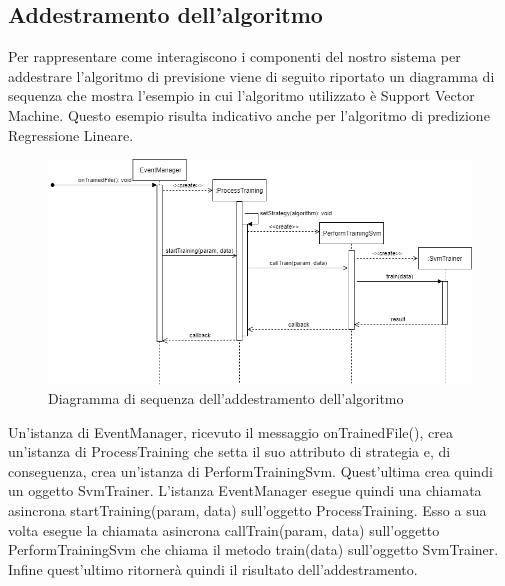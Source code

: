 	\subsection{Addestramento dell'algoritmo}
	Per rappresentare come interagiscono i componenti del nostro sistema per addestrare l'algoritmo di previsione viene di seguito riportato un diagramma di sequenza che mostra l'esempio in cui l'algoritmo utilizzato è Support Vector Machine. Questo esempio risulta indicativo anche per l'algoritmo di predizione Regressione Lineare.  
	\mbox{}
	\begin{landscape}
		\begin{figure} [H]
			\includegraphics[width=\linewidth]{./img/Diagrammi/ds2.png}
			\caption{Diagramma di sequenza dell'addestramento dell'algoritmo}
		\end{figure}
	\end{landscape}
	Un'istanza di EventManager, ricevuto il messaggio onTrainedFile(), crea un'istanza di ProcessTraining che setta il suo attributo di strategia e, di conseguenza, crea un'istanza di PerformTrainingSvm. Quest'ultima crea quindi un oggetto SvmTrainer.
	L'istanza EventManager esegue quindi una chiamata asincrona startTraining(param, data) sull'oggetto ProcessTraining. Esso a sua volta esegue la chiamata asincrona callTrain(param, data) sull'oggetto PerformTrainingSvm che chiama il metodo train(data) sull'oggetto SvmTrainer. Infine quest'ultimo ritornerà quindi il risultato dell'addestramento.